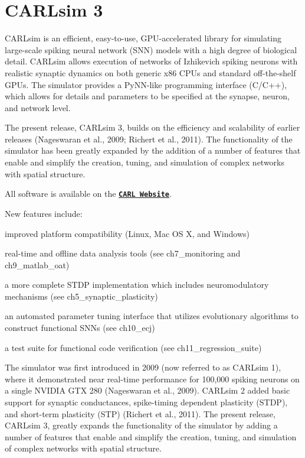 \hypertarget{index_main_carlsim}{}\section{C\+A\+R\+Lsim 3}\label{index_main_carlsim}
C\+A\+R\+Lsim is an efficient, easy-\/to-\/use, G\+P\+U-\/accelerated library for simulating large-\/scale spiking neural network (S\+NN) models with a high degree of biological detail. C\+A\+R\+Lsim allows execution of networks of Izhikevich spiking neurons with realistic synaptic dynamics on both generic x86 C\+P\+Us and standard off-\/the-\/shelf G\+P\+Us. The simulator provides a Py\+N\+N-\/like programming interface (C/\+C++), which allows for details and parameters to be specified at the synapse, neuron, and network level.

The present release, C\+A\+R\+Lsim 3, builds on the efficiency and scalability of earlier releases (Nageswaran et al., 2009; Richert et al., 2011). The functionality of the simulator has been greatly expanded by the addition of a number of features that enable and simplify the creation, tuning, and simulation of complex networks with spatial structure.

All software is available on the \href{http://www.socsci.uci.edu/~jkrichma/CARLsim/index.html}{\tt {\bfseries C\+A\+RL Website}}.

New features include\+:
\begin{DoxyItemize}
\item improved platform compatibility (Linux, Mac OS X, and Windows)
\item real-\/time and offline data analysis tools (see ch7\+\_\+monitoring and ch9\+\_\+matlab\+\_\+oat)
\item a more complete S\+T\+DP implementation which includes neuromodulatory mechanisms (see ch5\+\_\+synaptic\+\_\+plasticity)
\item an automated parameter tuning interface that utilizes evolutionary algorithms to construct functional S\+N\+Ns (see ch10\+\_\+ecj)
\item a test suite for functional code verification (see ch11\+\_\+regression\+\_\+suite)
\end{DoxyItemize}

The simulator was first introduced in 2009 (now referred to as C\+A\+R\+Lsim 1), where it demonstrated near real-\/time performance for 100,000 spiking neurons on a single N\+V\+I\+D\+IA G\+TX 280 (Nageswaran et al., 2009). C\+A\+R\+Lsim 2 added basic support for synaptic conductances, spike-\/timing dependent plasticity (S\+T\+DP), and short-\/term plasticity (S\+TP) (Richert et al., 2011). The present release, C\+A\+R\+Lsim 3, greatly expands the functionality of the simulator by adding a number of features that enable and simplify the creation, tuning, and simulation of complex networks with spatial structure.

